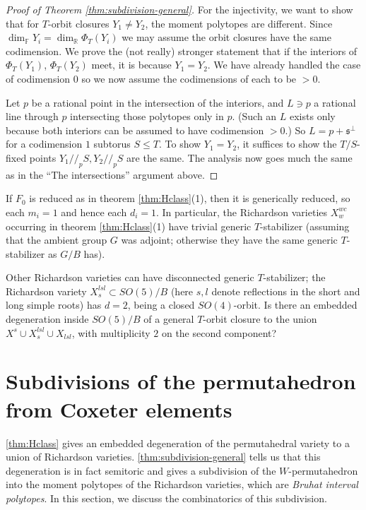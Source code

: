 \documentclass[11pt]{amsart}
\theoremstyle{definition}
\newcommand{\RR}{\mathbb{R}}
\newcommand\lie[1]{{\mathfrak #1}}
\newcommand\FF{{\mathbb F}}
\begin{document}
\begin{proof}[Proof of Theorem \ref{thm:subdivision-general}]
  For the injectivity, we want to show that for $T$-orbit closures
  $Y_1 \neq Y_2$, the moment polytopes are different. Since
  $\dim_\FF Y_i = \dim_\RR \Phi_T(Y_i)$ we may assume the orbit
  closures have the same codimension. We prove the (not really) stronger
  statement that if the interiors of $\Phi_T(Y_1)$, $\Phi_T(Y_2)$ meet,
  it is because $Y_1 = Y_2$.
  We have already handled the case of codimension $0$ so we now assume
  the codimensions of each to be $>0$.

  Let $p$ be a rational point in the intersection of the interiors, and
  $L \ni p$ a rational line through $p$ intersecting those polytopes
  only in $p$. (Such an $L$ exists only because both interiors can be
  assumed to have codimension $>0$.) So $L = p + \lie s^\perp$ for a
  codimension $1$ subtorus $S\leq T$. To show $Y_1 = Y_2$, it suffices
  to show the $T/S$-fixed points $Y_1 //_p S, Y_2 //_p S$ are the same.
  The analysis now goes much the same as in the ``The intersections''
  argument above.
\end{proof}

If $F_0$ is reduced as in theorem \ref{thm:Hclass}(1), then it is
generically reduced, so each $m_i=1$ and hence each $d_i=1$.
In particular, the Richardson varieties $X_w^{wc}$ occurring in
theorem \ref{thm:Hclass}(1) have trivial generic $T$-stabilizer
(assuming that the ambient group $G$ was adjoint; otherwise they have
the same generic $T$-stabilizer as $G/B$ has).

Other Richardson varieties can have disconnected generic
$T$-stabilizer; the Richardson variety $X_s^{lsl} \subset SO(5)/B$
(here $s,l$ denote reflections in the short and long simple roots)
has $d=2$, being a closed $SO(4)$-orbit. Is there an embedded degeneration
inside $SO(5)/B$ of a general $T$-orbit closure to the union
$X^s \cup X_s^{lsl} \cup X_{lsl}$, with multiplicity $2$ on the
second component?



\section{Subdivisions of the permutahedron from Coxeter elements}\label{sec:subdiv-permutahedron}



\cref{thm:Hclass} gives an embedded degeneration of the permutahedral variety to a union of Richardson varieties.  \cref{thm:subdivision-general} tells us that this degeneration is in fact semitoric and gives a subdivision of the $W$-permutahedron into the moment polytopes of the Richardson varieties, which are \emph{Bruhat interval polytopes}. In this section, we discuss the combinatorics of this subdivision.
\end{document}
